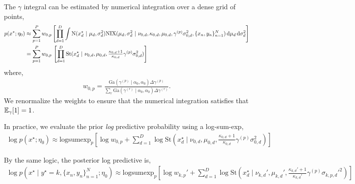 The $\gamma$ integral can be estimated by numerical integration over a dense grid of points,
\begin{align*}
p(x^\star; \eta_0)
&\approx \sum_{p=1}^P
    w_{0,p}
    \left[ \prod_{d=1}^D
    \int \mathrm{N}(x^\star_d ~\vert~ \mu_d, \sigma^2_d)
    \mathrm{NIX}(\mu_d, \sigma^2_d ~\vert~ \nu_{0,d}, \kappa_{0,d}, \mu_{0,d}, \gamma^{(p)} \sigma^2_{0,d}, \{x_n, y_n\}_{n=1}^N)
    \mathop{}\!\mathrm{d} \mu_d \mathop{}\!\mathrm{d} \sigma^2_d \right] \\
&= \sum_{p=1}^P
    w_{0,p} \,
    \left[ \prod_{d=1}^D
    \mathrm{St}(x^\star_d ~\vert~ \nu_{0,d}, \mu_{0,d},
    \tfrac{\kappa_{0,d}+1}{\kappa_{0,d}} \gamma^{(p)}\sigma^2_{0,d}) \right]
\end{align*}
where,
\begin{align*}
    w_{0, p} = \frac{\mathrm{Ga}(\gamma^{(p)} \mid \alpha_0, \alpha_0) \Delta\gamma^{(p)}}{\sum_r \mathrm{Ga}(\gamma^{(r)} \mid \alpha_0, \alpha_0) \Delta\gamma^{(r)}}.
\end{align*}
We renormalize the weights to ensure that the numerical integration satisfies that $\mathbb{E}_\gamma[1] = 1$.

In practice, we evaluate the prior \textit{log} predictive probability using a log-sum-exp,
\begin{align*}
   \log p(x^\star; \eta_0)
   \approx \mathrm{logsumexp}_p \left[ \log w_{0,p} + \sum_{d=1}^D \log \mathrm{St}(x_d^\star \mid \nu_{0,d}, \mu_{0,d}, \tfrac{\kappa_{0,d} + 1}{\kappa_{0,d}} \gamma^{(p)} \sigma_{0,d}^2) \right]
\end{align*}

By the same logic, the posterior log predictive is,
\begin{align*}
   \log p(x^\star \mid y^\star=k, \{x_n, y_n\}_{n=1}^N; \eta_0)
   \approx \mathrm{logsumexp}_p \left[ \log w_{k,p}' + \sum_{d=1}^D \log \mathrm{St}(x_d^\star \mid \nu_{k,d}', \mu_{k,d}', \tfrac{\kappa_{k,d}'+ 1}{\kappa_{k,d}'} \gamma^{(p)} \sigma_{k,p,d}'^2) \right]
\end{align*}

